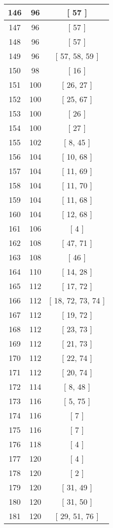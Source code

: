 \begin{center}
\begin{longtable}[H]{|| c c c ||}
\hline
146 & 96 & [ 57 ] \\ 
\hline
147 & 96 & [ 57 ] \\ 
\hline
148 & 96 & [ 57 ] \\ 
\hline
149 & 96 & [ 57, 58, 59 ] \\ 
\hline
150 & 98 & [ 16 ] \\ 
\hline
151 & 100 & [ 26, 27 ] \\ 
\hline
152 & 100 & [ 25, 67 ] \\ 
\hline
153 & 100 & [ 26 ] \\ 
\hline
154 & 100 & [ 27 ] \\ 
\hline
155 & 102 & [ 8, 45 ] \\ 
\hline
156 & 104 & [ 10, 68 ] \\ 
\hline
157 & 104 & [ 11, 69 ] \\ 
\hline
158 & 104 & [ 11, 70 ] \\ 
\hline
159 & 104 & [ 11, 68 ] \\ 
\hline
160 & 104 & [ 12, 68 ] \\ 
\hline
161 & 106 & [ 4 ] \\ 
\hline
162 & 108 & [ 47, 71 ] \\ 
\hline
163 & 108 & [ 46 ] \\ 
\hline
164 & 110 & [ 14, 28 ] \\ 
\hline
165 & 112 & [ 17, 72 ] \\ 
\hline
166 & 112 & [ 18, 72, 73, 74 ] \\ 
\hline
167 & 112 & [ 19, 72 ] \\ 
\hline
168 & 112 & [ 23, 73 ] \\ 
\hline
169 & 112 & [ 21, 73 ] \\ 
\hline
170 & 112 & [ 22, 74 ] \\ 
\hline
171 & 112 & [ 20, 74 ] \\ 
\hline
172 & 114 & [ 8, 48 ] \\ 
\hline
173 & 116 & [ 5, 75 ] \\ 
\hline
174 & 116 & [ 7 ] \\ 
\hline
175 & 116 & [ 7 ] \\ 
\hline
176 & 118 & [ 4 ] \\ 
\hline
177 & 120 & [ 4 ] \\ 
\hline
178 & 120 & [ 2 ] \\ 
\hline
179 & 120 & [ 31, 49 ] \\ 
\hline
180 & 120 & [ 31, 50 ] \\ 
\hline
181 & 120 & [ 29, 51, 76 ] \\ 

\end{longtable}
\end{center}
